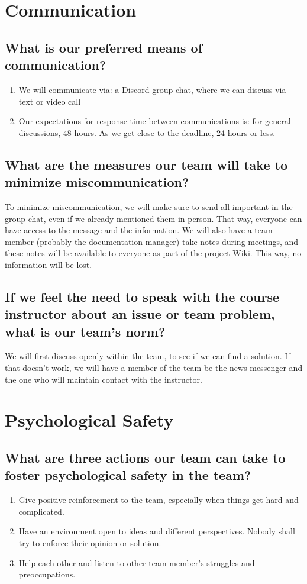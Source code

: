 \documentclass[11pt]{article}
\begin{document}
\section*{Communication}
\subsection*{What is our preferred means of communication?}
\begin{enumerate}[label=(\alph*)]
    \item We will communicate via:
    a Discord group chat, where we can discuss via text or video call
    \item Our expectations for response-time between communications is:
    for general discussions, 48 hours. As we get close to the deadline, 24 hours or less.
\end{enumerate}
\subsection*{What are the measures our team will take to minimize miscommunication?}
To minimize miscommunication, we will make sure to send all important in the group chat, even if we already mentioned them in person. That way, everyone can have access to the message and the information. We will also have a team member (probably the documentation manager) take notes during meetings, and these notes will be available to everyone as part of the project Wiki. This way, no information will be lost.
\subsection*{If we feel the need to speak with the course instructor about an issue or team problem, what is our team's norm?}
We will first discuss openly within the team, to see if we can find a solution. If that doesn't work, we will have a member of the team be the news messenger and the one who will maintain contact with the instructor.

\section*{Psychological Safety}
\subsection*{What are three actions our team can take to foster psychological safety in the team?}
\begin{enumerate}
    \item Give positive reinforcement to the team, especially when things get hard and complicated.
    \item Have an environment open to ideas and different perspectives. Nobody shall try to enforce their opinion or solution.
    \item Help each other and listen to other team member's struggles and preoccupations.
\end{enumerate}
\end{document}
